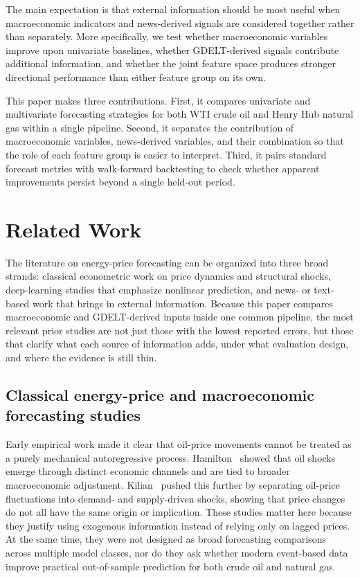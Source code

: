 \documentclass[pdflatex,sn-mathphys-num]{sn-jnl}%
\theoremstyle{thmstyleone}%
\theoremstyle{thmstyletwo}%
\theoremstyle{thmstylethree}%
\begin{document}
The main expectation is that external information should be most useful when macroeconomic indicators and news-derived signals are considered together rather than separately. More specifically, we test whether macroeconomic variables improve upon univariate baselines, whether GDELT-derived signals contribute additional information, and whether the joint feature space produces stronger directional performance than either feature group on its own.

This paper makes three contributions. First, it compares univariate and multivariate forecasting strategies for both WTI crude oil and Henry Hub natural gas within a single pipeline. Second, it separates the contribution of macroeconomic variables, news-derived variables, and their combination so that the role of each feature group is easier to interpret. Third, it pairs standard forecast metrics with walk-forward backtesting to check whether apparent improvements persist beyond a single held-out period.

\section{Related Work}\label{sec2a}

The literature on energy-price forecasting can be organized into three broad strands: classical econometric work on price dynamics and structural shocks, deep-learning studies that emphasize nonlinear prediction, and news- or text-based work that brings in external information. Because this paper compares macroeconomic and GDELT-derived inputs inside one common pipeline, the most relevant prior studies are not just those with the lowest reported errors, but those that clarify what each source of information adds, under what evaluation design, and where the evidence is still thin.

\subsection*{Classical energy-price and macroeconomic forecasting studies}
Early empirical work made it clear that oil-price movements cannot be treated as a purely mechanical autoregressive process. Hamilton~\cite{hamilton2003} showed that oil shocks emerge through distinct economic channels and are tied to broader macroeconomic adjustment. Kilian~\cite{kilian2009} pushed this further by separating oil-price fluctuations into demand- and supply-driven shocks, showing that price changes do not all have the same origin or implication. These studies matter here because they justify using exogenous information instead of relying only on lagged prices. At the same time, they were not designed as broad forecasting comparisons across multiple model classes, nor do they ask whether modern event-based data improve practical out-of-sample prediction for both crude oil and natural gas.
\end{document}
